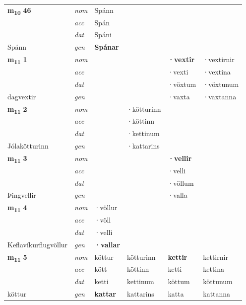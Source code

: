 \begin{longtable}[l]{X>{\footnotesize\itshape}XXXXX}
\multirow{3}{*}{{{\textbf{m{\textsubscript{10}}} \Large{\textbf{46}}}}}  
 & nom & Spánn &     & \textbf{} &   \\*
 & acc & Spán  &    &   &  \\*
 & dat & Spáni &    &  &  \\*
 {\footnotesize{Spánn}} &  gen & \textbf{Spánar}  &   &  &  \\
\cmidrule{1-6}


\multirow{3}{*}{{{\textbf{m{\textsubscript{11}}} \Large{\textbf{1}}}}}  
 & nom &  &     & \textbf{·vextir} & ·vextirnir  \\*
 & acc &   &    & ·vexti  & ·vextina \\*
 & dat &  &    & ·vöxtum & ·vöxtunum \\*
 {\footnotesize{dagvextir}} &  gen & \textbf{}  &   & ·vaxta & ·vaxtanna \\
\cmidrule{1-6}


\multirow{3}{*}{{{\textbf{m{\textsubscript{11}}} \Large{\textbf{2}}}}}  
 & nom &  & ·kötturinn    & \textbf{} &   \\*
 & acc &   & ·köttinn   &   &  \\*
 & dat &  & ·kettinum   &  &  \\*
 {\footnotesize{Jólakötturinn}} &  gen & \textbf{}  & ·kattarins  &  &  \\
\cmidrule{1-6}


\multirow{3}{*}{{{\textbf{m{\textsubscript{11}}} \Large{\textbf{3}}}}}  
 & nom &  &     & \textbf{·vellir} &   \\*
 & acc &   &    & ·velli  &  \\*
 & dat &  &    & ·völlum &  \\*
 {\footnotesize{Þingvellir}} &  gen & \textbf{}  &   & ·valla &  \\
\cmidrule{1-6}


\multirow{3}{*}{{{\textbf{m{\textsubscript{11}}} \Large{\textbf{4}}}}}  
 & nom & ·völlur &     & \textbf{} &   \\*
 & acc & ·völl  &    &   &  \\*
 & dat & ·velli &    &  &  \\*
 {\footnotesize{Keflavíkurflugvöllur}} &  gen & \textbf{·vallar}  &   &  &  \\
\cmidrule{1-6}


\multirow{3}{*}{{{\textbf{m{\textsubscript{11}}} \Large{\textbf{5}}}}}  
 & nom & köttur & kötturinn    & \textbf{kettir} & kettirnir  \\*
 & acc & kött  & köttinn   & ketti  & kettina \\*
 & dat & ketti & kettinum   & köttum & köttunum \\*
 {\footnotesize{köttur}} &  gen & \textbf{kattar}  & kattarins  & katta & kattanna \\
\cmidrule{1-6}



\end{longtable}
